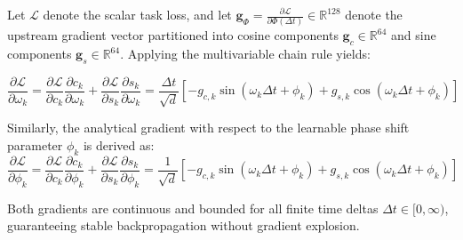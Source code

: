 Let $\mathcal{L}$ denote the scalar task loss, and let $\mathbf{g}_{\Phi} = \frac{\partial \mathcal{L}}{\partial \Phi(\Delta t)} \in \mathbb{R}^{128}$ denote the upstream gradient vector partitioned into cosine components $\mathbf{g}_c \in \mathbb{R}^{64}$ and sine components $\mathbf{g}_s \in \mathbb{R}^{64}$. Applying the multivariable chain rule yields:

\begin{equation}
    \frac{\partial \mathcal{L}}{\partial \omega_k} = \frac{\partial \mathcal{L}}{\partial c_k} \frac{\partial c_k}{\partial \omega_k} + \frac{\partial \mathcal{L}}{\partial s_k} \frac{\partial s_k}{\partial \omega_k} = \frac{\Delta t}{\sqrt{d}} \left[ -g_{c, k} \sin(\omega_k \Delta t + \phi_k) + g_{s, k} \cos(\omega_k \Delta t + \phi_k) \right]
\end{equation}

Similarly, the analytical gradient with respect to the learnable phase shift parameter $\phi_k$ is derived as:
\begin{equation}
    \frac{\partial \mathcal{L}}{\partial \phi_k} = \frac{\partial \mathcal{L}}{\partial c_k} \frac{\partial c_k}{\partial \phi_k} + \frac{\partial \mathcal{L}}{\partial s_k} \frac{\partial s_k}{\partial \phi_k} = \frac{1}{\sqrt{d}} \left[ -g_{c, k} \sin(\omega_k \Delta t + \phi_k) + g_{s, k} \cos(\omega_k \Delta t + \phi_k) \right]
\end{equation}

Both gradients are continuous and bounded for all finite time deltas $\Delta t \in [0, \infty)$, guaranteeing stable backpropagation without gradient explosion.
